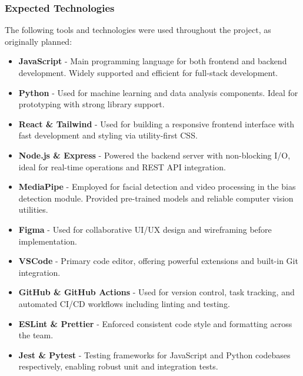 \documentclass{article}
\begin{document}
\subsubsection{Expected Technologies}

The following tools and technologies were used throughout the project, as originally planned:

\begin{itemize}
    \item \textbf{JavaScript} - Main programming language for both frontend and backend development. 
    Widely supported and efficient for full-stack development.
    
    \item \textbf{Python} - Used for machine learning and data analysis components. 
    Ideal for prototyping with strong library support.
    
    \item \textbf{React \& Tailwind} - Used for building a responsive frontend interface with fast development 
    and styling via utility-first CSS.
    
    \item \textbf{Node.js \& Express} - Powered the backend server with non-blocking I/O, 
    ideal for real-time operations and REST API integration.
    
    \item \textbf{MediaPipe} - Employed for facial detection and video processing in the bias detection module. 
    Provided pre-trained models and reliable computer vision utilities.
    
    \item \textbf{Figma} - Used for collaborative UI/UX design and wireframing before implementation.
    
    \item \textbf{VSCode} - Primary code editor, offering powerful extensions and built-in Git integration.
    
    \item \textbf{GitHub \& GitHub Actions} - Used for version control, task tracking, and automated CI/CD workflows 
    including linting and testing.
    
    \item \textbf{ESLint \& Prettier} - Enforced consistent code style and formatting across the team.
    
    \item \textbf{Jest \& Pytest} - Testing frameworks for JavaScript and Python codebases respectively, 
    enabling robust unit and integration tests.
    

\end{itemize}
\end{document}
